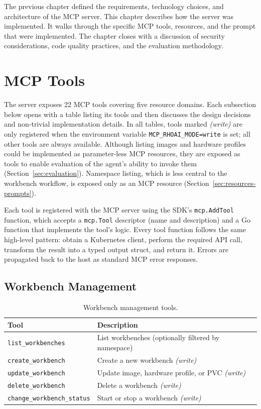 \documentclass[
  digital,     %
  oneside,     %
  nosansbold,  %
  nocolorbold, %
  lof,         %
  lot,         %
]{fithesis4}
\begin{document}
The previous chapter defined the requirements, technology choices, and
architecture of the MCP server. This chapter describes how the server was
implemented. It walks through the specific MCP tools, resources, and the
prompt that were implemented. The chapter
closes with a discussion of security considerations, code quality
practices, and the evaluation methodology.

\section{MCP Tools}
\label{sec:tools}

The server exposes 22 MCP tools covering five resource domains. Each
subsection below opens with a table listing its tools and then discusses
the design decisions and non-trivial implementation details. In all
tables, tools marked \textit{(write)} are only registered when the
environment variable \texttt{MCP\_RHOAI\_MODE=write} is set; all other
tools are always available. Although listing images and hardware
profiles could be implemented as parameter-less MCP resources, they are
exposed as tools to enable evaluation of the agent's ability to invoke
them (Section~\ref{sec:evaluation}). Namespace listing, which is less
central to the workbench workflow, is exposed only as an MCP resource
(Section~\ref{sec:resources-prompts}).

Each tool is registered with the MCP server using the SDK's
\texttt{mcp.AddTool} function, which accepts a \texttt{mcp.Tool}
descriptor (name and description) and a Go function that implements the
tool's logic. Every tool function follows the
same high-level pattern: obtain a Kubernetes client, perform the required
API call, transform the result into a typed output struct, and return it.
Errors are propagated back to the host as standard MCP error responses.

\subsection{Workbench Management}
\label{subsec:workbench-tools}

\begin{table}[!htbp]
\caption{Workbench management tools.}
\label{tab:tools-workbench}
\small
\begin{tabularx}{\textwidth}{lX}
\toprule
\textbf{Tool} & \textbf{Description} \\
\midrule
\texttt{list\_workbenches}        & List workbenches (optionally filtered by namespace) \\
\texttt{create\_workbench}         & Create a new workbench \textit{(write)} \\
\texttt{update\_workbench}         & Update image, hardware profile, or PVC \textit{(write)} \\
\texttt{delete\_workbench}         & Delete a workbench \textit{(write)} \\
\texttt{change\_workbench\_status} & Start or stop a workbench \textit{(write)} \\
\bottomrule
\end{tabularx}
\end{table}
\end{document}
